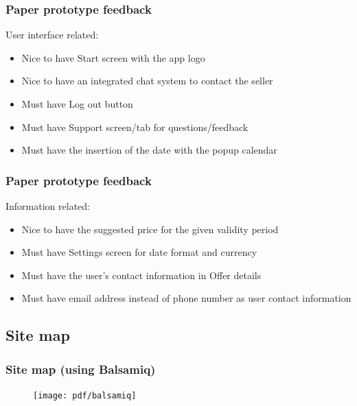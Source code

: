 \documentclass{beamer}
\begin{document}

\begin{frame}
\frametitle{Paper prototype feedback}
User interface related:
\begin{itemize}
\item Nice to have Start screen with the app logo
\item Nice to have an integrated chat system to contact the seller
\item Must have Log out button
\item Must have Support screen/tab for questions/feedback
\item Must have the insertion of the date with the popup calendar
\end{itemize}
\end{frame}


\begin{frame}
\frametitle{Paper prototype feedback}
Information related:
\begin{itemize}
\item Nice to have the suggested price for the given validity period
\item Must have Settings screen for date format and currency
\item Must have the user's contact information in Offer details 
\item Must have email address instead of phone number as user contact information

\end{itemize}
\end{frame}


\subsection{Site map} %


\begin{frame}
\frametitle{Site map (using Balsamiq)}
\begin{figure}
\texttt{[image: pdf/balsamiq]}
\end{figure}
\end{frame}
\end{document}
